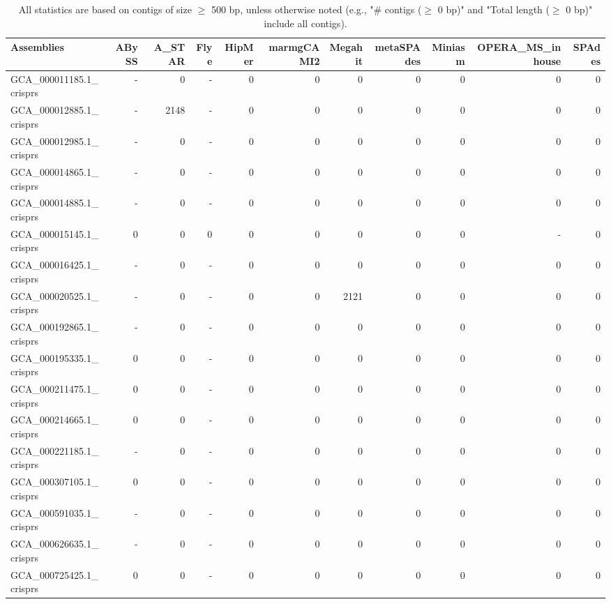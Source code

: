 \documentclass[12pt,a4paper]{article}
\begin{document}
\begin{table}[ht]
\begin{center}
\caption{All statistics are based on contigs of size $\geq$ 500 bp, unless otherwise noted (e.g., "\# contigs ($\geq$ 0 bp)" and "Total length ($\geq$ 0 bp)" include all contigs).}
\begin{tabular}{|l*{10}{|r}|}
\hline
Assemblies & ABySS & A\_STAR & Flye & HipMer & marmgCAMI2 & Megahit & metaSPAdes & Miniasm & OPERA\_MS\_inhouse & SPAdes \\ \hline
GCA\_000011185.1\_crisprs & - & 0 & - & 0 & 0 & 0 & 0 & 0 & 0 & 0 \\ \hline
GCA\_000012885.1\_crisprs & - & 2148 & - & 0 & 0 & 0 & 0 & 0 & 0 & 0 \\ \hline
GCA\_000012985.1\_crisprs & - & 0 & - & 0 & 0 & 0 & 0 & 0 & 0 & 0 \\ \hline
GCA\_000014865.1\_crisprs & - & 0 & - & 0 & 0 & 0 & 0 & 0 & 0 & 0 \\ \hline
GCA\_000014885.1\_crisprs & - & 0 & - & 0 & 0 & 0 & 0 & 0 & 0 & 0 \\ \hline
GCA\_000015145.1\_crisprs & 0 & 0 & 0 & 0 & 0 & 0 & 0 & 0 & - & 0 \\ \hline
GCA\_000016425.1\_crisprs & - & 0 & - & 0 & 0 & 0 & 0 & 0 & 0 & 0 \\ \hline
GCA\_000020525.1\_crisprs & - & 0 & - & 0 & 0 & 2121 & 0 & 0 & 0 & 0 \\ \hline
GCA\_000192865.1\_crisprs & - & 0 & - & 0 & 0 & 0 & 0 & 0 & 0 & 0 \\ \hline
GCA\_000195335.1\_crisprs & 0 & 0 & - & 0 & 0 & 0 & 0 & 0 & 0 & 0 \\ \hline
GCA\_000211475.1\_crisprs & 0 & 0 & - & 0 & 0 & 0 & 0 & 0 & 0 & 0 \\ \hline
GCA\_000214665.1\_crisprs & 0 & 0 & - & 0 & 0 & 0 & 0 & 0 & 0 & 0 \\ \hline
GCA\_000221185.1\_crisprs & - & 0 & - & 0 & 0 & 0 & 0 & 0 & 0 & 0 \\ \hline
GCA\_000307105.1\_crisprs & 0 & 0 & - & 0 & 0 & 0 & 0 & 0 & 0 & 0 \\ \hline
GCA\_000591035.1\_crisprs & - & 0 & - & 0 & 0 & 0 & 0 & 0 & 0 & 0 \\ \hline
GCA\_000626635.1\_crisprs & - & 0 & - & 0 & 0 & 0 & 0 & 0 & 0 & 0 \\ \hline
GCA\_000725425.1\_crisprs & 0 & 0 & - & 0 & 0 & 0 & 0 & 0 & 0 & 0 \\ \hline
\end{tabular}
\end{center}
\end{table}
\end{document}
